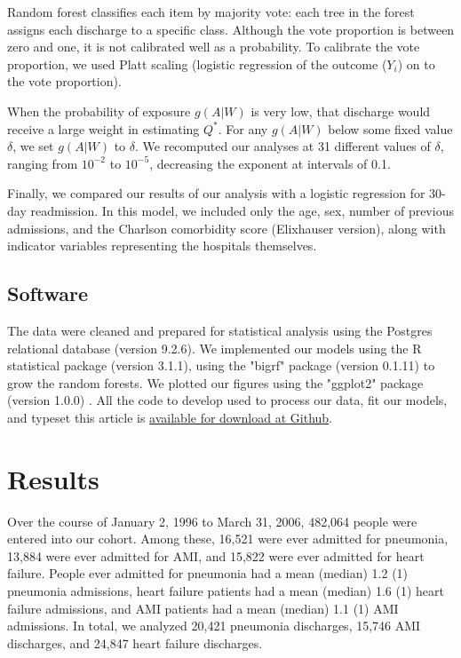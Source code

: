 \documentclass[]{article}\usepackage[]{graphicx}\usepackage[]{color}
\begin{document}
Random forest classifies each item by majority vote: each tree in the forest assigns each discharge to a specific class. Although the vote proportion is between zero and one, it is not calibrated well as a probability. To calibrate the vote proportion, we used Platt scaling\supercite{platt_probabilistic_1999} (logistic regression of the outcome ($Y_i$) on to the vote proportion).

When the probability of exposure $g(A|W)$ is very low, that discharge would receive a large weight in estimating $Q^*$. For any $g(A|W)$ below some fixed value $\delta$, we set $g(A|W)$ to $\delta$. We recomputed our analyses at 31 different values of $\delta$, ranging from $10^{-2}$ to $10^{-5}$, decreasing the exponent at intervals of 0.1.

Finally, we compared our results of our analysis with a logistic regression for 30-day readmission. In this model, we included only the age, sex, number of previous admissions, and the Charlson comorbidity score (Elixhauser version)\supercite{elixhauser_comorbidity_1998}, along with indicator variables representing the hospitals themselves.

\subsection{Software}
The data were cleaned and prepared for statistical analysis using the Postgres relational database (version 9.2.6). We implemented our models using the R statistical package (version 3.1.1),\supercite{team_r:_2014} using the "bigrf" package (version 0.1.11) to grow the random forests.\supercite{lim_bigrf:_2014} We plotted our figures using the "ggplot2" package (version 1.0.0) .\supercite{wickham_ggplot2:_2009} All the code to develop used to process our data, fit our models, and typeset this article is \href{https://github.com/nograpes/tmle_readmissions}{available for download at Github}.

\section{Results}


Over the course of January 2, 1996 to March 31, 2006, 482,064 people were entered into our cohort. Among these, 16,521 were ever admitted for pneumonia, 13,884 were ever admitted for AMI, and 15,822 were ever admitted for heart failure. People ever admitted for pneumonia had a mean (median) 1.2 (1) pneumonia admissions, heart failure patients had a mean (median) 1.6 (1) heart failure admissions, and AMI patients had a mean (median) 1.1 (1) AMI admissions. In total, we analyzed 20,421 pneumonia discharges, 15,746 AMI discharges, and 24,847 heart failure discharges.
\end{document}
